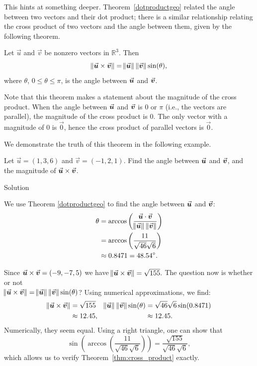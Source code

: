 This hints at something deeper. Theorem~\ref{dotproductgeo} related the angle between two vectors and their dot product; there is a similar relationship relating the cross product of two vectors and the angle between them, given by the following theorem.

\begin{theorem}\label{thm:cross_product}
Let $\vec u$ and $\vec v$ be nonzero vectors in $\mathbb{R}^3$. Then
$$\norm{\crossp uv} = \vnorm u\, \vnorm v \sin (\theta),$$
where $\theta$, $0\leq \theta \leq \pi$, is the angle between $\vecu$ and $\vecv$.
\end{theorem}

Note that this theorem makes a statement about the magnitude of the cross product. When the angle between $\vecu$ and $\vecv$ is 0 or $\pi$ (i.e., the vectors are parallel), the magnitude of the cross product is 0. The only vector with a magnitude of 0 is $\vec 0$, hence the cross product of  parallel vectors is $\vec 0$.

We demonstrate the truth of this theorem in the following example.

\begin{example}\label{ex_crossp3}
Let $\vec u = \left( 1,3,6\right)$ and $\vec v = \left( -1,2,1\right)$. Find the angle between $\vecu$ and $\vecv$, and the magnitude of $\crossp uv$.

\ifanalysis\pagebreak\fi
{}Solution 


We use Theorem \ref{dotproductgeo} to find the angle between $\vecu$ and $\vecv$: 
\begin{align*}
\theta &= \arccos\left(\frac{\dotp uv}{\vnorm u\, \vnorm v}\right) \\
			&= \arccos\left(\frac{11}{\sqrt{46}\sqrt{6}}\right)\\
			&\approx 0.8471 = 48.54^\circ.
\end{align*}

Since $\crossp uv = \left( -9,-7,5\right)$ we have $\norm{\crossp uv} = \sqrt{155}.$ The question now is whether or not \\ $\norm{\crossp uv} = \vnorm u\, \vnorm v\sin(\theta)$? Using numerical approximations, we find:
\begin{align*}
\norm{\crossp uv} &=\sqrt{155}  & \vnorm u\,\vnorm v \sin(\theta) & = \sqrt{46}\sqrt{6}\sin (0.8471)\\
									&\approx 12.45, & &\approx 12.45.
\end{align*}
Numerically, they seem equal. Using a right triangle, one can show that 
$$\sin\left(\arccos\left(\frac{11}{\sqrt{46}\sqrt{6}}\right)\right) = \frac{\sqrt{155}}{\sqrt{46}\sqrt{6}},$$ which allows us to verify Theorem~\ref{thm:cross_product} exactly.
\end{example}




